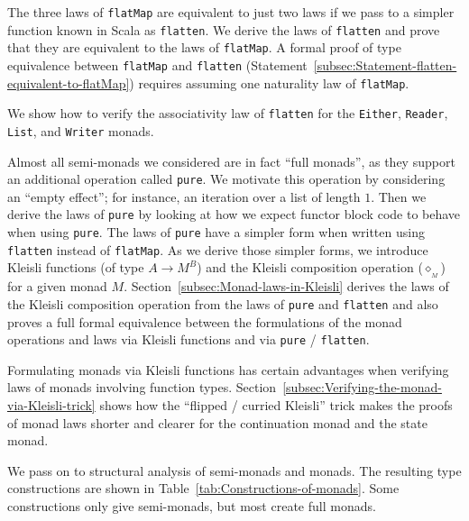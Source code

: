 The three laws of \lstinline!flatMap! are equivalent to just two
laws if we pass to a simpler function known in Scala as \lstinline!flatten!.
We derive the laws of \lstinline!flatten! and prove that they are
equivalent to the laws of \lstinline!flatMap!. A formal proof of
type equivalence between \lstinline!flatMap! and \lstinline!flatten!
(Statement~\ref{subsec:Statement-flatten-equivalent-to-flatMap})
requires assuming one naturality law of \lstinline!flatMap!. 

We show how to verify the associativity law of \lstinline!flatten!
for the \lstinline!Either!, \lstinline!Reader!, \lstinline!List!,
and \lstinline!Writer! monads. 

Almost all semi-monads we considered are in fact \textsf{``}full monads\textsf{''},
as they support an additional operation called \lstinline!pure!.
We motivate this operation by considering an \textsf{``}empty effect\textsf{''}; for
instance, an iteration over a list of length $1$. Then we derive
the laws of \lstinline!pure! by looking at how we expect functor
block code to behave when using \lstinline!pure!. The laws of \lstinline!pure!
have a simpler form when written using \lstinline!flatten! instead
of \lstinline!flatMap!. As we derive those simpler forms, we introduce
Kleisli functions (of type $A\rightarrow M^{B}$) and the Kleisli
composition operation ($\diamond_{_{M}}$) for a given monad $M$.
Section~\ref{subsec:Monad-laws-in-Kleisli} derives the laws of the
Kleisli composition operation from the laws of \lstinline!pure! and
\lstinline!flatten! and also proves a full formal equivalence between
the formulations of the monad operations and laws via Kleisli functions
and via \lstinline!pure! / \lstinline!flatten!.

Formulating monads via Kleisli functions has certain advantages when
verifying laws of monads involving function types. Section~\ref{subsec:Verifying-the-monad-via-Kleisli-trick}
shows how the \textsf{``}flipped / curried Kleisli\textsf{''} trick makes the proofs
of monad laws shorter and clearer for the continuation monad and the
state monad.

We pass on to structural analysis of semi-monads and monads. The resulting
type constructions are shown in Table~\ref{tab:Constructions-of-monads}.
Some constructions only give semi-monads, but most create full monads.

